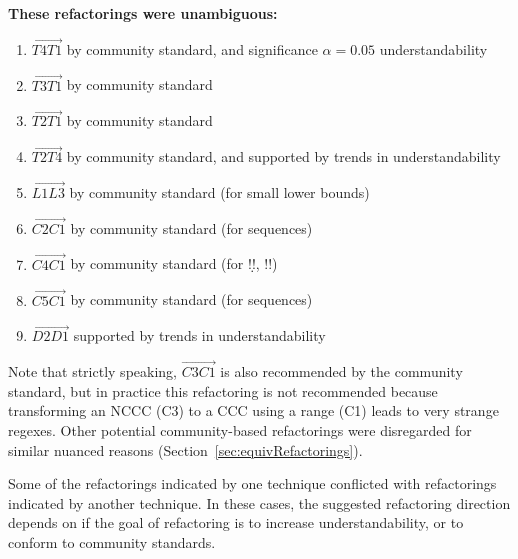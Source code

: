 \textbf{These refactorings were unambiguous:}
\begin{enumerate}
\item $\overrightarrow{T4 T1}$ by community standard, and significance $\alpha=0.05$ understandability
\item $\overrightarrow{T3 T1}$ by community standard
\item $\overrightarrow{T2 T1}$ by community standard
\item $\overrightarrow{T2 T4}$ by community standard, and supported by trends in understandability

\item $\overrightarrow{L1 L3}$ by community standard (for small lower bounds)
\item $\overrightarrow{C2 C1}$ by community standard (for sequences)
\item $\overrightarrow{C4 C1}$ by community standard (for \bverb!\d!, \bverb!\w!)
\item $\overrightarrow{C5 C1}$ by community standard (for sequences)
\item $\overrightarrow{D2 D1}$ supported by trends in understandability
\end{enumerate}
Note that strictly speaking, $\overrightarrow{C3 C1}$ is also recommended by the community standard, but in practice this refactoring is not recommended because transforming an NCCC (C3) to a CCC using a range (C1) leads to very strange regexes.  Other potential community-based refactorings were disregarded for similar nuanced reasons (Section~\ref{sec:equivRefactorings}).


Some of the refactorings indicated by one technique conflicted with refactorings indicated by another technique.  In these cases, the suggested refactoring direction depends on if the goal of refactoring is to increase understandability, or to conform to community standards.

